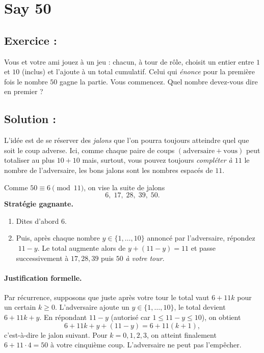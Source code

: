 \section{Say 50}

\subsection*{Exercice :}

\begin{exerciseBox}[Say 50]
Vous et votre ami jouez à un jeu : chacun, à tour de rôle, choisit un entier
entre \(1\) et \(10\) (inclus) et l'ajoute à un total cumulatif.
Celui qui \emph{énonce} pour la première fois le nombre \(50\) gagne la partie.
Vous commencez. Quel nombre devez-vous dire en premier ?    
\end{exerciseBox}


\subsection*{Solution :}

L'idée est de se réserver des \emph{jalons} que l'on pourra toujours atteindre
quel que soit le coup adverse. Ici, comme chaque paire de coups
\((\text{adversaire} + \text{vous})\) peut totaliser au plus \(10+10\) mais,
surtout, vous pouvez toujours \emph{compléter à \(11\)} le nombre de l'adversaire,
les bons jalons sont les nombres espacés de \(11\).

Comme \(50 \equiv 6 \pmod{11}\), on vise la suite de jalons
\[
6,\;17,\;28,\;39,\;50 .
\]
\textbf{Stratégie gagnante.}
\begin{enumerate}
  \item Dites d'abord \(\boxed{6}\).
  \item Puis, après chaque nombre \(y\in\{1,\dots,10\}\) annoncé par l'adversaire,
        répondez \(\;11-y\). Le total augmente alors de \(y+(11-y)=11\)
        et passe successivement à \(17, 28, 39\) puis \(50\) \emph{à votre tour}.
\end{enumerate}

\paragraph{Justification formelle.}
Par récurrence, supposons que juste après votre tour le total vaut \(6+11k\)
pour un certain \(k\ge 0\). L'adversaire ajoute un \(y\in\{1,\dots,10\}\),
le total devient \(6+11k+y\). En répondant \(11-y\) (autorisé car
\(1\le 11-y\le 10\)), on obtient
\[
6+11k+y+(11-y)=6+11(k+1),
\]
c'est-à-dire le jalon suivant. Pour \(k=0,1,2,3\), on atteint finalement
\(6+11\cdot 4=50\) à votre cinquième coup. L'adversaire ne peut pas l'empêcher.

